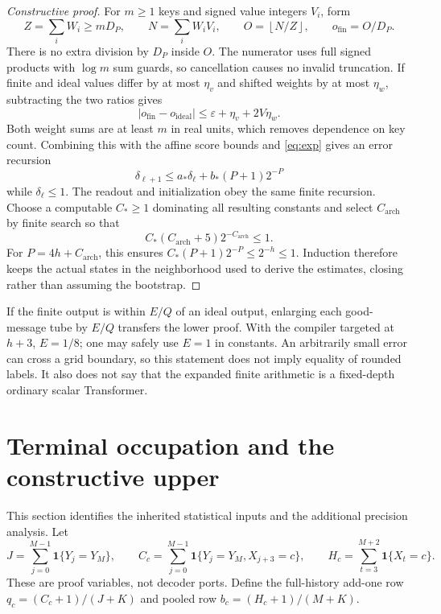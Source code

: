 \documentclass[11pt,letterpaper]{article}
\theoremstyle{definition}\newtheorem{definition}[theorem]{Definition}
\theoremstyle{remark}\newtheorem{remark}[theorem]{Remark}
\newcommand{\ind}{\mathbf{1}}
\newcommand{\floor}[1]{\left\lfloor #1\right\rfloor}
\begin{document}
\begin{proof}[Constructive proof]
For $m\ge1$ keys and signed value integers $V_i$, form
\begin{equation}\label{eq:signedmean}
 Z=\sum_iW_i\ge mD_P,\qquad N=\sum_iW_iV_i,\qquad
 O=\floor{N/Z},\qquad o_{\mathrm{fin}}=O/D_P.
\end{equation}
There is no extra division by $D_P$ inside $O$. The numerator uses full signed products with $\log m$ sum guards, so cancellation causes no invalid truncation. If finite and ideal values differ by at most $\eta_v$ and shifted weights by at most $\eta_w$, subtracting the two ratios gives
\[
 |o_{\mathrm{fin}}-o_{\mathrm{ideal}}|\le
 \varepsilon+\eta_v+2V\eta_w.
\]
Both weight sums are at least $m$ in real units, which removes dependence on key count. Combining this with the affine score bounds and \eqref{eq:exp} gives an error recursion
\[
 \delta_{\ell+1}\le a_*\delta_\ell+b_*(P+1)2^{-P}
\]
while $\delta_\ell\le1$. The readout and initialization obey the same finite recursion. Choose a computable $C_*\ge1$ dominating all resulting constants and select $C_{\mathrm{arch}}$ by finite search so that
\[
 C_*(C_{\mathrm{arch}}+5)2^{-C_{\mathrm{arch}}}\le1.
\]
For $P=4h+C_{\mathrm{arch}}$, this ensures $C_*(P+1)2^{-P}\le2^{-h}\le1$. Induction therefore keeps the actual states in the neighborhood used to derive the estimates, closing rather than assuming the bootstrap.
\end{proof}

If the finite output is within $E/Q$ of an ideal output, enlarging each good-message tube by $E/Q$ transfers the lower proof. With the compiler targeted at $h+3$, $E=1/8$; one may safely use $E=1$ in constants. An arbitrarily small error can cross a grid boundary, so this statement does not imply equality of rounded labels. It also does not say that the expanded finite arithmetic is a fixed-depth ordinary scalar Transformer.

\section{Terminal occupation and the constructive upper}\label{sec:upper}
This section identifies the inherited statistical inputs and the additional precision analysis. Let
\[
 J=\sum_{j=0}^{M-1}\ind\{Y_j=Y_M\},\qquad
 C_c=\sum_{j=0}^{M-1}\ind\{Y_j=Y_M,X_{j+3}=c\},\qquad
 H_c=\sum_{t=3}^{M+2}\ind\{X_t=c\}.
\]
These are proof variables, not decoder ports. Define the full-history add-one row $q_c=(C_c+1)/(J+K)$ and pooled row $b_c=(H_c+1)/(M+K)$.
\end{document}
